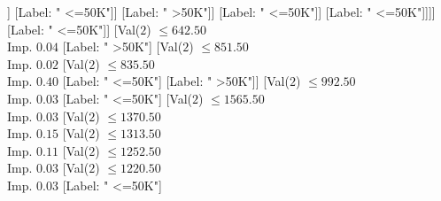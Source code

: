 \documentclass[margin=10pt]{standalone}
\begin{document}
\begin{forest}
																				[Val($2$) $ \leq 1696.50$ \\ Imp. $0.01$
																					[Val($2$) $ \leq 618.50$ \\ Imp. $0.02$
																						[Val($2$) $ \leq 374.50$ \\ Imp. $0.10$
																							[Val($2$) $ \leq 24.50$ \\ Imp. $0.04$
																								[Label: " <=50K"]
																								[Val($2$) $ \leq 53.50$ \\ Imp. $0.10$
																									[Label: " >50K"]
																									[Val($2$) $ \leq 348.50$ \\ Imp. $0.04$
																										[Val($2$) $ \leq 258.50$ \\ Imp. $0.12$
																											[Val($2$) $ \leq 193.50$ \\ Imp. $0.12$
																												[Val($2$) $ \leq 84.50$ \\ Imp. $0.20$
																													[Val($2$) $ \leq 62.50$ \\ Imp. $0.92$
																														[Label: " <=50K"]
																														[Label: " >50K"]]
																													[Label: " <=50K"]]
																												[Label: " >50K"]]
																											[Label: " <=50K"]]
																										[Label: " <=50K"]]]]
																							[Label: " <=50K"]]
																						[Val($2$) $ \leq 642.50$ \\ Imp. $0.04$
																							[Label: " >50K"]
																							[Val($2$) $ \leq 851.50$ \\ Imp. $0.02$
																								[Val($2$) $ \leq 835.50$ \\ Imp. $0.40$
																									[Label: " <=50K"]
																									[Label: " >50K"]]
																								[Val($2$) $ \leq 992.50$ \\ Imp. $0.03$
																									[Label: " <=50K"]
																									[Val($2$) $ \leq 1565.50$ \\ Imp. $0.03$
																										[Val($2$) $ \leq 1370.50$ \\ Imp. $0.15$
																											[Val($2$) $ \leq 1313.50$ \\ Imp. $0.11$
																												[Val($2$) $ \leq 1252.50$ \\ Imp. $0.03$
																													[Val($2$) $ \leq 1220.50$ \\ Imp. $0.03$
																														[Label: " <=50K"]

\end{forest}
\end{document}
